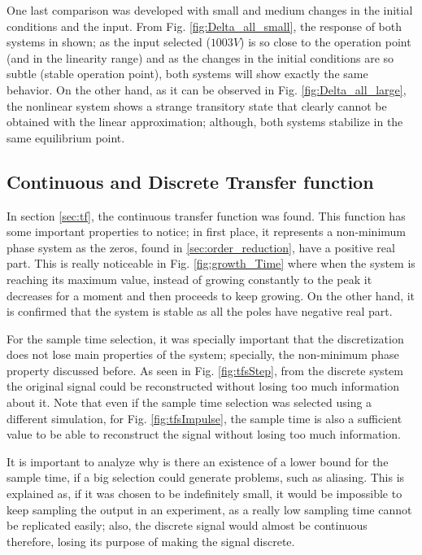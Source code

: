 One last comparison was developed with small and medium changes in the initial conditions and the input. From Fig. \ref{fig:Delta_all_small}, the response of both systems in shown; as the input selected ($1003V$) is so close to the operation point (and in the linearity range) and as the changes in the initial conditions are so subtle (stable operation point), both systems will show exactly the same behavior. On the other hand, as it can be observed in Fig. \ref{fig:Delta_all_large}, the nonlinear system shows a strange transitory state that clearly cannot be obtained with the linear approximation; although, both systems stabilize in the same equilibrium point.

\subsection{Continuous and Discrete Transfer function}
In section \ref{sec:tf}, the continuous transfer function was found. This function has some important properties to notice; in first place, it represents a non-minimum phase system as the zeros, found in \ref{sec:order_reduction}, have a positive real part. This is really noticeable in Fig. \ref{fig:growth_Time} where when the system is reaching its maximum value, instead of growing constantly to the peak it decreases for a moment and then proceeds to keep growing. On the other hand, it is confirmed that the system is stable as all the poles have negative real part.

For the sample time selection, it was specially important that the discretization does not lose main properties of the system; specially, the non-minimum phase property discussed before. As seen in Fig. \ref{fig:tfsStep}, from the discrete system the original signal could be reconstructed without losing too much information about it. Note that even if the sample time selection was selected using a different simulation, for Fig. \ref{fig:tfsImpulse}, the sample time is also a sufficient value to be able to reconstruct the signal without losing too much information. 

It is important to analyze why is there an existence of a lower bound for the sample time, if a big selection could generate problems, such as aliasing. This is explained as, if it was chosen to be indefinitely small, it would be impossible to keep sampling the output in an experiment, as a really low sampling time cannot be replicated easily; also, the discrete signal would almost be continuous therefore, losing its purpose of making the signal discrete.


